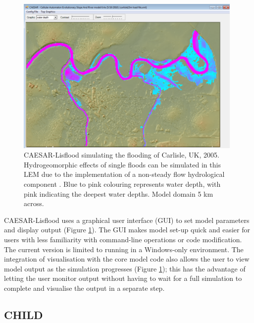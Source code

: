 \begin{figure}[t]
\includegraphics[width=11cm]{LEMFinalRevisedmanuscriptDAVFinalrevisions-img/LEMFinalRevisedmanuscriptDAVFinalrevisions-img007.png} 
\caption{CAESAR-Lisflood simulating the flooding of Carlisle, UK, 2005. Hydrogeomorphic effects of single floods can be simulated in this LEM due to the implementation of a non-steady flow hydrological component \citep{bates2010simple}. Blue to pink colouring represents water depth, with pink indicating the deepest water depths. Model domain 5 km across.}
\label{fig_LEM_CAEASR_Lisflood}
\end{figure}

CAESAR-Lisflood uses a graphical user interface (GUI) to set model parameters and display output (Figure \ref{fig_LEM_CAEASR_Lisflood}). The GUI makes model set-up quick and easier for users with less familiarity with command-line operations or code modification. The current version is limited to running in a Windows-only environment. The integration of visualisation with the core model code also allows the user to view model output as the simulation progresses (Figure \ref{fig_LEM_CAEASR_Lisflood}); this has the advantage of letting the user monitor output without having to wait for a full simulation to complete and visualise the output in a separate step. 

\subsection{CHILD}

